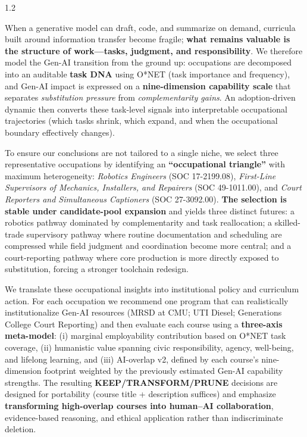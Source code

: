 \begin{spacing}{1.2}

\vspace{0.5em}

When a generative model can draft, code, and summarize on demand, curricula built around information transfer become fragile; \textbf{what remains valuable is the structure of work---tasks, judgment, and responsibility}. We therefore model the Gen-AI transition from the ground up: occupations are decomposed into an auditable \textbf{task DNA} using O*NET (task importance and frequency), and Gen-AI impact is expressed on a \textbf{nine-dimension capability scale} that separates \emph{substitution pressure} from \emph{complementarity gains}. An adoption-driven dynamic then converts these task-level signals into interpretable occupational trajectories (which tasks shrink, which expand, and when the occupational boundary effectively changes).

To ensure our conclusions are not tailored to a single niche, we select three representative occupations by identifying an \textbf{``occupational triangle''} with maximum heterogeneity: \emph{Robotics Engineers} (SOC 17-2199.08), \emph{First-Line Supervisors of Mechanics, Installers, and Repairers} (SOC 49-1011.00), and \emph{Court Reporters and Simultaneous Captioners} (SOC 27-3092.00). \textbf{The selection is stable under candidate-pool expansion} and yields three distinct futures: a robotics pathway dominated by complementarity and task reallocation; a skilled-trade supervisory pathway where routine documentation and scheduling are compressed while field judgment and coordination become more central; and a court-reporting pathway where core production is more directly exposed to substitution, forcing a stronger toolchain redesign.

We translate these occupational insights into institutional policy and curriculum action. For each occupation we recommend one program that can realistically institutionalize Gen-AI resources (MRSD at CMU; UTI Diesel; Generations College Court Reporting) and then evaluate each course using a \textbf{three-axis meta-model}: (i) marginal employability contribution based on O*NET task coverage, (ii) humanistic value spanning civic responsibility, agency, well-being, and lifelong learning, and (iii) AI-overlap v2, defined by each course's nine-dimension footprint weighted by the previously estimated Gen-AI capability strengths. The resulting \textbf{KEEP/TRANSFORM/PRUNE} decisions are designed for portability (course title + description suffices) and emphasize \textbf{transforming high-overlap courses into human--AI collaboration}, evidence-based reasoning, and ethical application rather than indiscriminate deletion.


\end{spacing}
